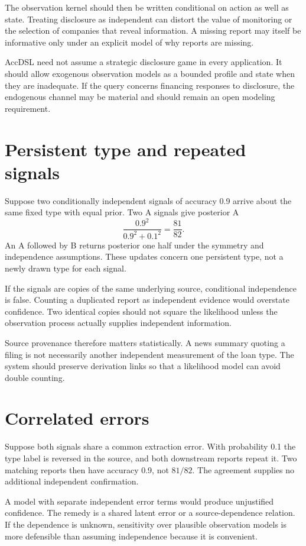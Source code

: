 The observation kernel should then be written conditional on action as well as state. Treating disclosure as independent can distort the value of monitoring or the selection of companies that reveal information. A missing report may itself be informative only under an explicit model of why reports are missing.

AccDSL need not assume a strategic disclosure game in every application. It should allow exogenous observation models as a bounded profile and state when they are inadequate. If the query concerns financing responses to disclosure, the endogenous channel may be material and should remain an open modeling requirement.

\section{Persistent type and repeated signals}
Suppose two conditionally independent signals of accuracy 0.9 arrive about the same fixed type with equal prior. Two A signals give posterior A
\begin{equation}
 \frac{0.9^2}{0.9^2+0.1^2}=\frac{81}{82}.
\end{equation}
An A followed by B returns posterior one half under the symmetry and independence assumptions. These updates concern one persistent type, not a newly drawn type for each signal.

If the signals are copies of the same underlying source, conditional independence is false. Counting a duplicated report as independent evidence would overstate confidence. Two identical copies should not square the likelihood unless the observation process actually supplies independent information.

Source provenance therefore matters statistically. A news summary quoting a filing is not necessarily another independent measurement of the loan type. The system should preserve derivation links so that a likelihood model can avoid double counting.

\section{Correlated errors}
Suppose both signals share a common extraction error. With probability 0.1 the type label is reversed in the source, and both downstream reports repeat it. Two matching reports then have accuracy 0.9, not $81/82$. The agreement supplies no additional independent confirmation.

A model with separate independent error terms would produce unjustified confidence. The remedy is a shared latent error or a source-dependence relation. If the dependence is unknown, sensitivity over plausible observation models is more defensible than assuming independence because it is convenient.

